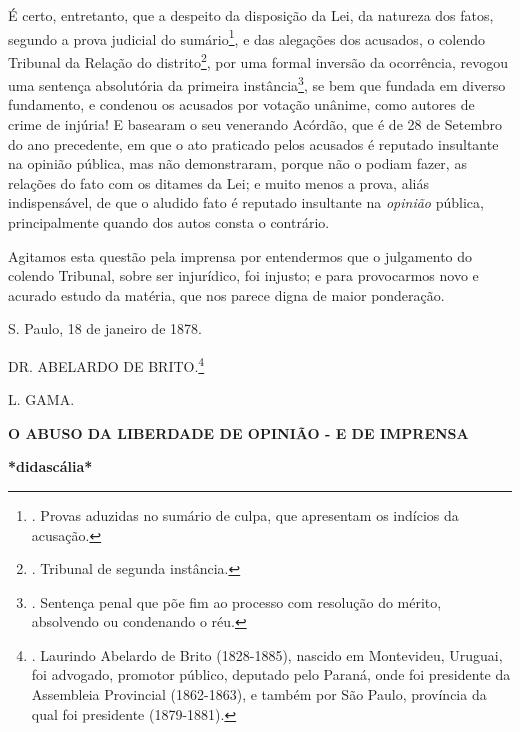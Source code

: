 É certo, entretanto, que a despeito da disposição da Lei, da natureza
dos fatos, segundo a prova judicial do sumário\footnote{. Provas
  aduzidas no sumário de culpa, que apresentam os indícios da acusação.},
e das alegações dos acusados, o colendo Tribunal da Relação do
distrito\footnote{. Tribunal de segunda instância.}, por uma formal
inversão da ocorrência, revogou uma sentença absolutória da primeira
instância\footnote{. Sentença penal que põe fim ao processo com
  resolução do mérito, absolvendo ou condenando o réu.}, se bem que
fundada em diverso fundamento, e condenou os acusados por votação
unânime, como autores de crime de injúria! E basearam o seu venerando
Acórdão, que é de 28 de Setembro do ano precedente, em que o ato
praticado pelos acusados é reputado insultante na opinião pública, mas
não demonstraram, porque não o podiam fazer, as relações do fato com os
ditames da Lei; e muito menos a prova, aliás indispensável, de que o
aludido fato é reputado insultante na \emph{opinião} pública,
principalmente quando dos autos consta o contrário.

Agitamos esta questão pela imprensa por entendermos que o julgamento do
colendo Tribunal, sobre ser injurídico, foi injusto; e para provocarmos
novo e acurado estudo da matéria, que nos parece digna de maior
ponderação.

S. Paulo, 18 de janeiro de 1878.

DR. ABELARDO DE BRITO.\footnote{. Laurindo Abelardo de Brito
  (1828-1885), nascido em Montevideu, Uruguai, foi advogado, promotor
  público, deputado pelo Paraná, onde foi presidente da Assembleia
  Provincial (1862-1863), e também por São Paulo, província da qual foi
  presidente (1879-1881).}

\protect\hypertarget{Secao_Sem_Titulo-9}{}{}L. GAMA.

\protect\hypertarget{Secao_Sem_Titulo-10}{}{}\textbf{O ABUSO DA
LIBERDADE DE OPINIÃO - E DE IMPRENSA}

\textbf{*didascália*}

